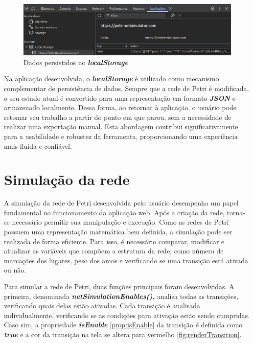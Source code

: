 \documentclass[
	12pt,				%
	openright,			%
	oneside,			%
	a4paper,			%
	english,			%
	brazil				%
	]{abntex2}
\theoremstyle{doispontos}
\begin{document}


\begin{figure}[ht] 
	\centering
	\includegraphics[scale=0.6]{figuras/localStorage.png}
	\caption[Dados persistidos no localStorage]{Dados persistidos no \textbf{\textit{localStorage}}}
	\label{fig:localStorage}
\end{figure}
\FloatBarrier

Na aplicação desenvolvida, o \textbf{\textit{localStorage}} é utilizado como mecanismo complementar de persistência de dados. Sempre que a rede de Petri é modificada, o seu estado atual é convertido para uma representação em formato \textbf{\textit{JSON}} e armazenado localmente. Dessa forma, ao retornar à aplicação, o usuário pode retomar seu trabalho a partir do ponto em que parou, sem a necessidade de realizar uma exportação manual. Esta abordagem contribui significativamente para a usabilidade e robustez da ferramenta, proporcionando uma experiência mais fluida e confiável. 

\section{Simulação da rede} \label{cap:simulation}

A simulação da rede de Petri desenvolvida pelo usuário desempenha um papel fundamental no funcionamento da aplicação web. Após a criação da rede, torna-se necessário permitir sua manipulação e execução. Como as redes de Petri possuem uma representação matemática bem definida, a simulação pode ser realizada de forma eficiente. Para isso, é necessário comparar, modificar e atualizar as variáveis que compõem a estrutura da rede, como número de marcações dos lugares, peso dos arcos e verificando se uma transição está ativada ou não. 

Para simular a rede de Petri, duas funções principais foram desenvolvidas. A primeira, denominada \textbf{\textit{netSimulationEnables()},} analisa todas as transições, verificando quais delas estão ativadas. Cada transição é analisada individualmente, verificando se as condições para ativação estão sendo cumpridas. Caso sim, a propriedade \textbf{\textit{isEnable}} \ref{prop:isEnable} da transição é definida como \textbf{\textit{true}} e a cor da transição na tela se altera para vermelho \ref{fig:renderTransition}. 
\end{document}
